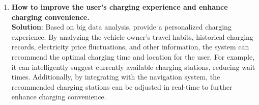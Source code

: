 \documentclass[
	english,
	ruledheaders=section,%
	class=report,%
	thesis={type=Report},%
	accentcolor=9c,%
	custommargins=true,%
	marginpar=false,%
	parskip=half-,%
	fontsize=11pt,%
	logofile={img/tuda_logo.pdf}, %
]{tudapub}
\begin{document}
\begin{enumerate}

    \item \textbf{How to improve the user's charging experience and enhance charging convenience.} \\
    \textbf{Solution}: Based on big data analysis, provide a personalized charging experience. By analyzing the vehicle owner's travel habits, historical charging records, electricity price fluctuations, and other information, the system can recommend the optimal charging time and location for the user. For example, it can intelligently suggest currently available charging stations, reducing wait times. Additionally, by integrating with the navigation system, the recommended charging stations can be adjusted in real-time to further enhance charging convenience.

    
\end{enumerate}

\end{document}
